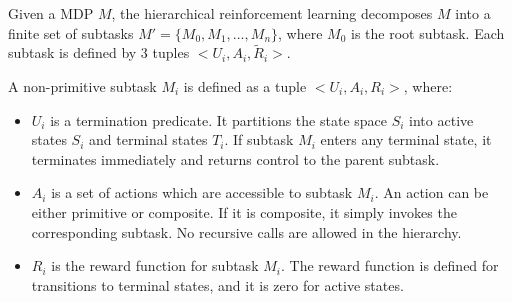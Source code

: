 



Given a MDP $M$, the hierarchical reinforcement learning decomposes $M$ into a finite
set of subtasks $M' = \{M_0, M_1, \dots, M_n\}$, where $M_0$ is the root subtask. 
Each subtask is defined by 3 tuples $<U_i, A_i, \tilde{R}_i>$. 
\begin{definition}
    A non-primitive subtask $M_i$ is defined as a tuple $<U_i, A_i, R_i>$, where:
    \begin{itemize}
    \item $U_i$ is a termination predicate. It partitions the state space $S_i$ into active states $S_i$ and
                terminal states $T_i$. If subtask $M_i$ enters any terminal state, it terminates immediately
                and returns control to the parent subtask. 
    \item $A_i$ is a set of actions which are accessible to subtask $M_i$. An action can be either primitive or composite.
                If it is composite, it simply invokes the corresponding subtask. No recursive calls 
                are allowed in the hierarchy.
    \item $R_i$ is the reward function for subtask $M_i$. The reward function is defined for transitions to terminal states, and it is zero for
        active states.
    \end{itemize}
\end{definition}


